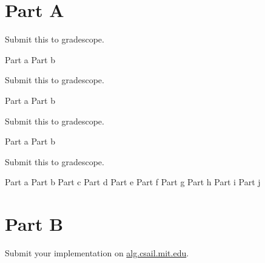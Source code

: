\documentclass[12pt,twoside]{article}
\begin{document}

\begin{problems}

\section*{Part A}

\problem  %
Submit this to gradescope.

\begin{problemparts}
\problempart Part a  %
\problempart Part b  %
\end{problemparts}

\problem  Submit this to gradescope.%
\begin{problemparts}
\problempart Part a  %
\problempart Part b  %
\end{problemparts}

\problem  Submit this to gradescope. %

\begin{problemparts}
\problempart Part a %
\problempart Part b %
\end{problemparts}

\problem Submit this to gradescope. %

\begin{problemparts}
\problempart Part a %
\problempart Part b %
\problempart Part c %
\problempart Part d %
\problempart Part e %
\problempart Part f %
\problempart Part g %
\problempart Part h %
\problempart Part i %
\problempart Part j %
\end{problemparts}

\section*{Part B}

\problem
Submit your implementation on \url{alg.csail.mit.edu}.

\end{problems}
\end{document}
